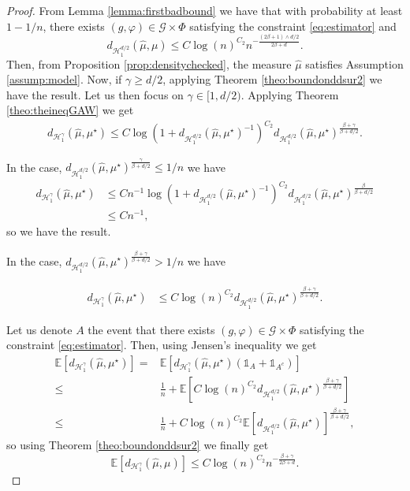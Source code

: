 \documentclass[10pt]{article}
\begin{document}
\begin{proof}
From Lemma \ref{lemma:firstbadbound} we have that with probability at least $1-1/n$, there exists $(g,\varphi)\in \mathcal{G}\times  \Phi$ satisfying the constraint \eqref{eq:estimator} and 
    $$d_{\mathcal{H}^{d/2}_1}(\hat{\mu},\mu)\leq C\log(n)^{C_2} n^{-\frac{(2\beta+1)\wedge d/2}{2\beta+d}}.$$ 
    Then, from Proposition \ref{prop:densitychecked}, the measure $\hat{\mu}$ satisfies Assumption  \ref{assump:model}. Now, if $\gamma\geq d/2$, applying Theorem \ref{theo:boundonddsur2} we have the result. Let us then focus on $\gamma \in [1,d/2)$.
Applying Theorem \ref{theo:theineqGAW} we get
\begin{align}\label{align:trickfornonprob}
d_{\mathcal{H}^\gamma_1}(\hat{\mu},\mu^\star)\leq C\log\left(1+d_{\mathcal{H}^{d/2}_1}(\hat{\mu},\mu^\star)^{-1}\right)^{C_2} d_{\mathcal{H}^{d/2}_1}(\hat{\mu},\mu^\star)^{\frac{\beta+\gamma}{\beta+d/2}}.
        \end{align}

In the case, $d_{\mathcal{H}^{d/2}_1}(\hat{\mu},\mu^\star)^{\frac{\gamma}{\beta+d/2}}\leq 1/n$ we have 
\begin{align*}
    d_{\mathcal{H}^\gamma_1}(\hat{\mu},\mu^\star)&  \leq  Cn^{-1}\log\left(1+d_{\mathcal{H}^{d/2}_1}(\hat{\mu},\mu^\star)^{-1}\right)^{C_2} d_{\mathcal{H}^{d/2}_1}(\hat{\mu},\mu^\star)^{\frac{\beta}{\beta+d/2}}\\
    & \leq Cn^{-1}, 
\end{align*}
so we have the result.

In the case, $d_{\mathcal{H}^{d/2}_1}(\hat{\mu},\mu^\star)^{\frac{\beta+\gamma}{\beta+d/2}}> 1/n$ we have

\begin{align*}
    d_{\mathcal{H}^\gamma_1}(\hat{\mu},\mu^\star) 
    & \leq C\log\left(n\right)^{C_2} d_{\mathcal{H}^{d/2}_1}(\hat{\mu},\mu^\star)^{\frac{\beta+\gamma}{\beta+d/2}}.
\end{align*}






        
Let us denote $A$  the event that there exists $(g,\varphi)\in \mathcal{G}\times  \Phi$ satisfying the constraint \eqref{eq:estimator}. Then, using Jensen's inequality we get
\begin{align*}
    \mathbb{E}[d_{\mathcal{H}^{\gamma}_1}(\hat{\mu},\mu^\star)]=&\mathbb{E}[d_{\mathcal{H}^{\gamma}_1}(\hat{\mu},\mu^\star)(\mathds{1}_{A}+\mathds{1}_{A^c})]\\
    \leq & \frac{1}{n} + \mathbb{E}[C\log\left(n\right)^{C_2} d_{\mathcal{H}^{d/2}_1}(\hat{\mu},\mu^\star)^{\frac{\beta+\gamma}{\beta+d/2}}]
    \\
    \leq & \frac{1}{n} + C\log\left(n\right)^{C_2}\mathbb{E}[ d_{\mathcal{H}^{d/2}_1}(\hat{\mu},\mu^\star)]^{\frac{\beta+\gamma}{\beta+d/2}},
\end{align*}
so using Theorem \ref{theo:boundonddsur2} we finally get 
$$\mathbb{E}[d_{\mathcal{H}^{\gamma}_1}(\hat{\mu},\mu)]\leq C \log(n)^{C_2} n^{-\frac{\beta+\gamma}{2\beta+d}}.$$
\end{proof}
\end{document}
